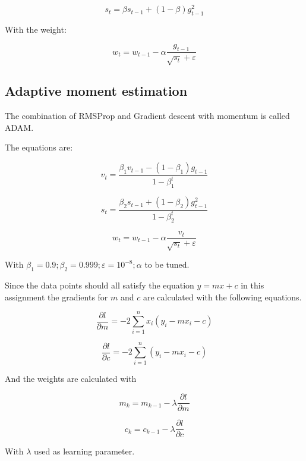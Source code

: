 \begin{equation}\label{RMS1}
    s_t = \beta s_{t-1} + (1 - \beta)g^2_{t-1}
\end{equation}

With the weight:

\begin{equation}\label{RMS2}
    w_t = w_{t-1} - \alpha \frac{g_{t-1}}{\sqrt{s_t}+\varepsilon}
\end{equation}

\subsection{Adaptive moment estimation}

The combination of \ac{RMSProp} and Gradient descent with momentum is called \ac{ADAM}.

The equations are:


\begin{equation}\label{ADAM1}
    v_t = \frac{\beta_1 v_{t-1} - (1 - \beta_1)g_{t-1}}{1 - \beta^t_1}
\end{equation}

\begin{equation}\label{ADAM2}
    s_t = \frac{\beta_2 s_{t-1} + (1 - \beta_2)g^2_{t-1}}{1 - \beta^t_2}
\end{equation}

\begin{equation}\label{RMS2}
    w_t = w_{t-1} - \alpha \frac{v_t}{\sqrt{s_t}+\varepsilon}
\end{equation}

With $\beta_1 = 0.9; \beta_2 = 0.999; \varepsilon = 10^{-8}; \alpha $ to be tuned.

Since the data points should all satisfy the equation $y = mx + c$ in this assignment the gradients for $m$ and $c$ are calculated with the following equations.

\begin{equation}\label{gradients1}
    \frac{\partial l}{\partial m} = -2 \sum\limits_{i=1}^n x_i (y_i - mx_i - c)
\end{equation}

\begin{equation}\label{gradients2}
    \frac{\partial l}{\partial c} = -2 \sum\limits_{i=1}^n (y_i - mx_i - c)
\end{equation}

And the weights are calculated with

\begin{equation}\label{gradients2}
    m_k = m_{k-1} - \lambda \frac{\partial l}{\partial m}
\end{equation}

\begin{equation}\label{gradients2}
    c_k = c_{k-1} - \lambda \frac{\partial l}{\partial c}
\end{equation}

With $\lambda$ used as learning parameter.

